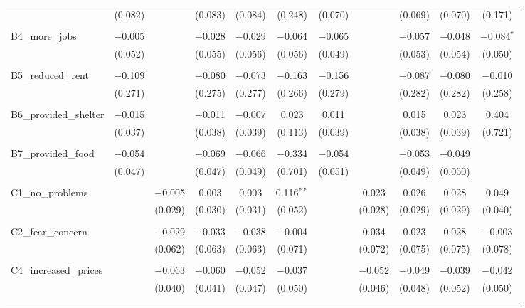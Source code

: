 \begin{table}[H]
\begin{tabular}{@{\extracolsep{4pt}}lcccccccccc}
  & (0.082) &  & (0.083) & (0.084) & (0.248) & (0.070) &  & (0.069) & (0.070) & (0.171) \\ 
  & & & & & & & & & & \\ 
 B4\_more\_jobs & $-$0.005 &  & $-$0.028 & $-$0.029 & $-$0.064 & $-$0.065 &  & $-$0.057 & $-$0.048 & $-$0.084$^{*}$ \\ 
  & (0.052) &  & (0.055) & (0.056) & (0.056) & (0.049) &  & (0.053) & (0.054) & (0.050) \\ 
  & & & & & & & & & & \\ 
 B5\_reduced\_rent & $-$0.109 &  & $-$0.080 & $-$0.073 & $-$0.163 & $-$0.156 &  & $-$0.087 & $-$0.080 & $-$0.010 \\ 
  & (0.271) &  & (0.275) & (0.277) & (0.266) & (0.279) &  & (0.282) & (0.282) & (0.258) \\ 
  & & & & & & & & & & \\ 
 B6\_provided\_shelter & $-$0.015 &  & $-$0.011 & $-$0.007 & 0.023 & 0.011 &  & 0.015 & 0.023 & 0.404 \\ 
  & (0.037) &  & (0.038) & (0.039) & (0.113) & (0.039) &  & (0.038) & (0.039) & (0.721) \\ 
  & & & & & & & & & & \\ 
 B7\_provided\_food & $-$0.054 &  & $-$0.069 & $-$0.066 & $-$0.334 & $-$0.054 &  & $-$0.053 & $-$0.049 &  \\ 
  & (0.047) &  & (0.047) & (0.049) & (0.701) & (0.051) &  & (0.049) & (0.050) &  \\ 
  & & & & & & & & & & \\ 
 C1\_no\_problems &  & $-$0.005 & 0.003 & 0.003 & 0.116$^{**}$ &  & 0.023 & 0.026 & 0.028 & 0.049 \\ 
  &  & (0.029) & (0.030) & (0.031) & (0.052) &  & (0.028) & (0.029) & (0.029) & (0.040) \\ 
  & & & & & & & & & & \\ 
 C2\_fear\_concern &  & $-$0.029 & $-$0.033 & $-$0.038 & $-$0.004 &  & 0.034 & 0.023 & 0.028 & $-$0.003 \\ 
  &  & (0.062) & (0.063) & (0.063) & (0.071) &  & (0.072) & (0.075) & (0.075) & (0.078) \\ 
  & & & & & & & & & & \\ 
 C4\_increased\_prices &  & $-$0.063 & $-$0.060 & $-$0.052 & $-$0.037 &  & $-$0.052 & $-$0.049 & $-$0.039 & $-$0.042 \\ 
  &  & (0.040) & (0.041) & (0.047) & (0.050) &  & (0.046) & (0.048) & (0.052) & (0.050) \\ 
  & & & & & & & & & & \\ 

\end{tabular}
\end{table}
